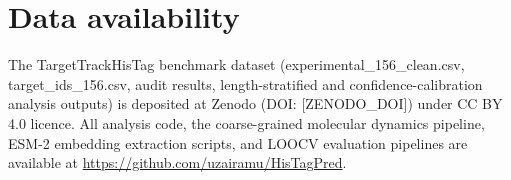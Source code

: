\documentclass[unnumsec,webpdf,contemporary,large]{oup-authoring-template}
\begin{document}
\section*{Data availability}
The TargetTrackHisTag benchmark dataset (experimental\_156\_clean.csv, target\_ids\_156.csv, audit results, length-stratified and confidence-calibration analysis outputs) is deposited at Zenodo (DOI: [ZENODO\_DOI]) under CC BY 4.0 licence. All analysis code, the coarse-grained molecular dynamics pipeline, ESM-2 embedding extraction scripts, and LOOCV evaluation pipelines are available at \url{https://github.com/uzairamu/HisTagPred}.



\end{document}
